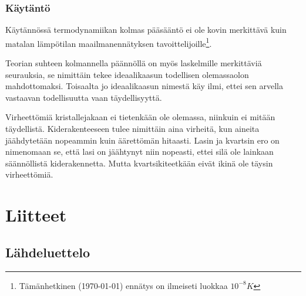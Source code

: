 \documentclass[12pt,a4paper,finnish]{book}
\begin{document}
% 
% 
% 
% 

\section{Käytäntö} %

Käytännössä termodynamiikan kolmas pääsääntö ei ole kovin merkittävä kuin matalan lämpötilan 
maailmanennätyksen tavoittelijoille\footnote{Tämänhetkinen (\today) ennätys on ilmeiseti luokkaa $10^{-8}K$}. 

Teorian suhteen kolmannella päännöllä on myös laskelmille merkittäviä seurauksia, se nimittäin 
tekee ideaalikaasun todellisen olemassaolon mahdottomaksi. Toisaalta jo ideaalikaasun nimestä käy ilmi, 
ettei sen arvella vastaavan todellisuutta vaan täydellisyyttä.

Virheettömiä kristallejakaan ei tietenkään ole olemassa, niinkuin ei mitään täydellistä. Kiderakenteeseen 
tulee nimittäin aina virheitä, kun aineita jäähdytetään nopeammin kuin äärettömän hitaasti. Lasin 
ja kvartsin ero on nimenomaan se, että lasi on jäähtynyt niin nopeasti, ettei silä ole lainkaan säännöllistä 
kiderakennetta. Mutta kvartsikiteetkään eivät ikinä ole täysin virheettömiä.

\part*{Liitteet} %
\setcounter{chapter}{0}

\chapter{Lähdeluettelo} %

{}

\end{document}

